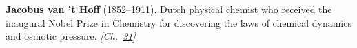 \nobelchemistry \textbf{Jacobus van ’t Hoff} (1852–1911). Dutch physical chemist who received the inaugural Nobel Prize in Chemistry for discovering the laws of chemical dynamics and osmotic pressure. \emph{[Ch.~\hyperref[ch:osmosisdebye]{31}]}

